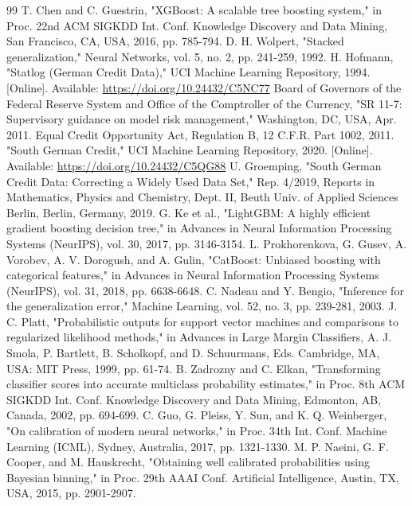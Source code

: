 \documentclass[conference,a4paper]{IEEEtran}
\begin{document}
\begin{thebibliography}{99}
 T. Chen and C. Guestrin, "XGBoost: A scalable tree boosting system," in Proc. 22nd ACM SIGKDD Int. Conf. Knowledge Discovery and Data Mining, San Francisco, CA, USA, 2016, pp. 785-794.
 D. H. Wolpert, "Stacked generalization," Neural Networks, vol. 5, no. 2, pp. 241-259, 1992.
 H. Hofmann, "Statlog (German Credit Data)," UCI Machine Learning Repository, 1994. [Online]. Available: \url{https://doi.org/10.24432/C5NC77}
 Board of Governors of the Federal Reserve System and Office of the Comptroller of the Currency, "SR 11-7: Supervisory guidance on model risk management," Washington, DC, USA, Apr. 2011.
 Equal Credit Opportunity Act, Regulation B, 12 C.F.R. Part 1002, 2011.
 "South German Credit," UCI Machine Learning Repository, 2020. [Online]. Available: \url{https://doi.org/10.24432/C5QG88}
 U. Groemping, "South German Credit Data: Correcting a Widely Used Data Set," Rep. 4/2019, Reports in Mathematics, Physics and Chemistry, Dept. II, Beuth Univ. of Applied Sciences Berlin, Berlin, Germany, 2019.
 G. Ke et al., "LightGBM: A highly efficient gradient boosting decision tree," in Advances in Neural Information Processing Systems (NeurIPS), vol. 30, 2017, pp. 3146-3154.
 L. Prokhorenkova, G. Gusev, A. Vorobev, A. V. Dorogush, and A. Gulin, "CatBoost: Unbiased boosting with categorical features," in Advances in Neural Information Processing Systems (NeurIPS), vol. 31, 2018, pp. 6638-6648.
 C. Nadeau and Y. Bengio, "Inference for the generalization error," Machine Learning, vol. 52, no. 3, pp. 239-281, 2003.
 J. C. Platt, "Probabilistic outputs for support vector machines and comparisons to regularized likelihood methods," in Advances in Large Margin Classifiers, A. J. Smola, P. Bartlett, B. Scholkopf, and D. Schuurmans, Eds. Cambridge, MA, USA: MIT Press, 1999, pp. 61-74.
 B. Zadrozny and C. Elkan, "Transforming classifier scores into accurate multiclass probability estimates," in Proc. 8th ACM SIGKDD Int. Conf. Knowledge Discovery and Data Mining, Edmonton, AB, Canada, 2002, pp. 694-699.
 C. Guo, G. Pleiss, Y. Sun, and K. Q. Weinberger, "On calibration of modern neural networks," in Proc. 34th Int. Conf. Machine Learning (ICML), Sydney, Australia, 2017, pp. 1321-1330.
 M. P. Naeini, G. F. Cooper, and M. Hauskrecht, "Obtaining well calibrated probabilities using Bayesian binning," in Proc. 29th AAAI Conf. Artificial Intelligence, Austin, TX, USA, 2015, pp. 2901-2907.

\end{thebibliography}
\end{document}
